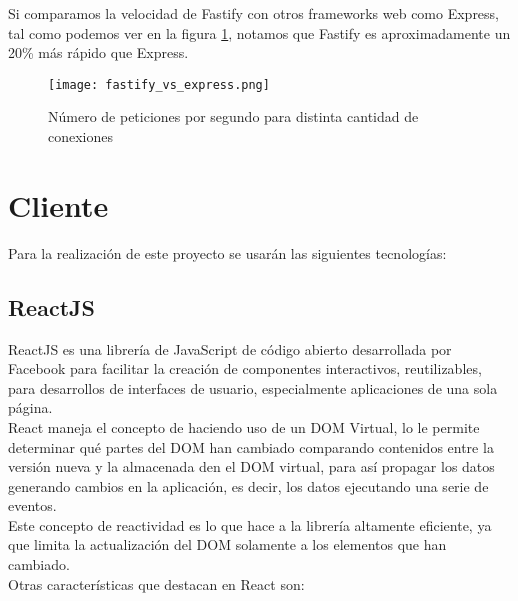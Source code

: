 Si comparamos la velocidad de Fastify con otros frameworks web como Express, tal como podemos ver en la figura \ref{fig:fastify_vs_express}, notamos que Fastify es aproximadamente un 20\% más rápido que Express. \\

\begin{figure}
    \texttt{[image: fastify\_vs\_express.png]}
    \caption{ Número de peticiones por segundo para distinta cantidad de conexiones}
    \label{fig:fastify_vs_express}
\end{figure}


\section{Cliente}

Para la realización de este proyecto se usarán las siguientes tecnologías:

\subsection{ReactJS}

ReactJS es una librería de JavaScript de código abierto desarrollada por Facebook para facilitar la creación de componentes interactivos, reutilizables, para desarrollos de interfaces de usuario, especialmente aplicaciones de una sola página.\\

React maneja el concepto de  haciendo uso de un DOM Virtual, lo le permite determinar qué partes del DOM han cambiado comparando contenidos entre la versión nueva y la almacenada den el DOM virtual, para así propagar los datos generando cambios en la aplicación, es decir, los datos  ejecutando una serie de eventos.\\

Este concepto de reactividad es lo que hace a la librería altamente eficiente, ya que limita la actualización del DOM solamente a los elementos que han cambiado.\\

Otras características que destacan en React son:\\

